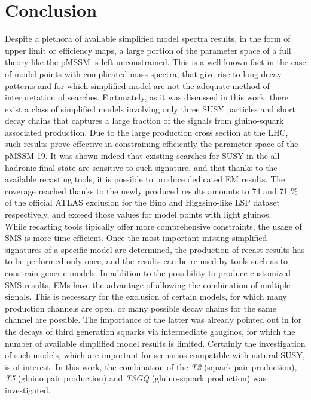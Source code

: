 \documentclass[epj,nopacs,fleqn]{svjour}
\begin{document}
\section{Conclusion}\label{sec:conclusion}
Despite a plethora of available simplified model spectra results, in the form of upper limit or efficiency maps, a large portion of the parameter space of a full theory like the pMSSM is left unconstrained. This is a well known fact in the case of model points with complicated mass spectra, that give rise to long decay patterns and for which simplified model are not the adequate method of interpretation of searches. Fortunately, as it was discussed in this work, there exist a class of simplified models involving only three SUSY particles and short decay chains that captures a large fraction of the signals from gluino-squark associated production. Due to the large production cross section at the LHC, such results prove effective in constraining efficiently the parameter space of the pMSSM-19. It was shown indeed that existing searches for SUSY in the all-hadronic final state are sensitive to such signature, and that thanks to the available recasting tools, it is possible to produce dedicated EM results. The coverage reached thanks to the newly produced results amounts to 74 and 71 $\%$ of the official ATLAS exclusion for the Bino and Higgsino-like LSP dataset respectively, and exceed those values for model points with light gluinos. 
\\
While recasting tools tipically offer more comprehensive constraints, the usage of SMS is more time-efficient. Once the most important missing simplified signatures of a specific model are determined, the production of recast results has to be performed only once, and the results can be re-used by tools such as \SMO to constrain generic models.
In addition to the possibility to produce customized SMS results, EMs have the advantage of allowing the combination of multiple signals. This is necessary for the exclusion of certain models, for which many production channels are open, or many possible decay chains for the same channel are possible. The importance of the latter was already pointed out in \cite{Ambrogi:2017lov} for the decays of third generation squarks via intermediate gauginos, for which the number of available simplified model results is limited. Certainly the investigation of such models, which are important for scenarios compatible with natural SUSY, is of interest. In this work, the combination of the \textit{T2} (squark pair production), \textit{T5} (gluino pair production) and \textit{T3GQ} (gluino-squark production) was investigated. 
\end{document}
